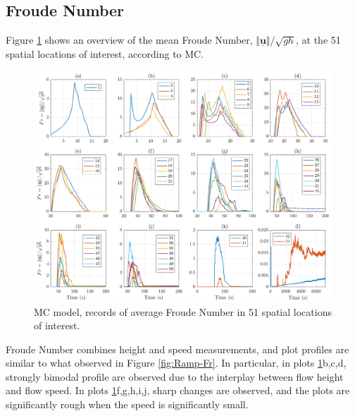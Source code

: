 \documentclass{article}
\begin{document}
\subsection{Froude Number}
Figure \ref{fig:BAF-Fr-MC} shows an overview of the mean Froude Number, $\Vert \underline{\mathbf{u}} \Vert/\sqrt{gh}$, at the 51 spatial locations of interest, according to MC.
\begin{figure}[H]
         \centering
        \includegraphics[width=1\textwidth]{MC&VS_51/Froude_MC2.png}
        \caption{MC model, records of average Froude Number in 51 spatial locations of interest.}
        \label{fig:BAF-Fr-MC}
\end{figure}
Froude Number combines height and speed measurements, and plot profiles are similar to what observed in Figure \ref{fig:Ramp-Fr}. In particular, in plots \ref{fig:BAF-Fr-MC}b,c,d, strongly bimodal profile are observed due to the interplay between flow height and flow speed. In plots \ref{fig:BAF-Fr-MC}f,g,h,i,j, sharp changes are observed, and the plots are significantly rough when the speed is significantly small.
\end{document}
